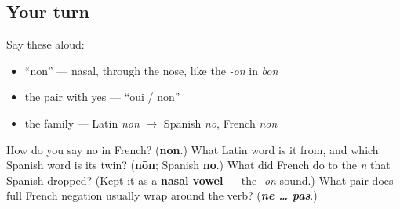 \subsection*{Your turn}
Say these aloud:

\begin{itemize}
\raggedright
  \item \textquotedblleft{}non\textquotedblright{} — nasal, through the nose, like the \emph{-on} in \emph{bon}
  \item the pair with yes — \textquotedblleft{}oui / non\textquotedblright{}
  \item the family — Latin \emph{nōn} $\to$ Spanish \emph{no}, French \emph{non}
\end{itemize}

\begin{tcolorbox}[breakable,colback=teal!4,colframe=teal!35!black,title={Before you move on}]
How do you say no in French? (\textbf{non}.) What Latin word is it from, and which Spanish word is its twin? (\textbf{nōn}; Spanish \textbf{no}.) What did French do to the \emph{n} that Spanish dropped? (Kept it as a \textbf{nasal vowel} — the \emph{-on} sound.) What pair does full French negation usually wrap around the verb? (\emph{\textbf{ne … pas}}.)
\end{tcolorbox}
